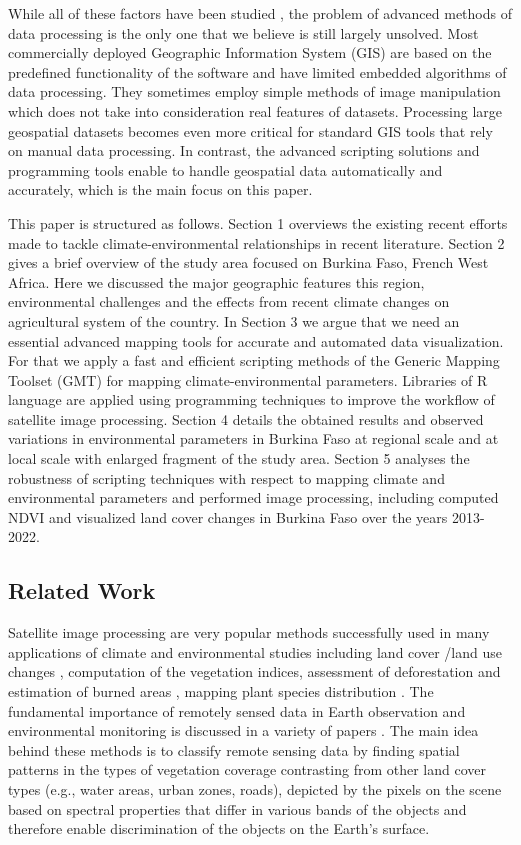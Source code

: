 \documentclass[knowledge,article,submit,pdftex,moreauthors]{Definitions/mdpi}
\begin{document}
While all of these factors have been studied \cite{Mather1987,Bocksberger}, the problem of advanced methods of data processing is the only one that we believe is still largely unsolved. Most commercially deployed Geographic Information System (GIS) are based on the predefined functionality of the software and have limited embedded algorithms of data processing. They sometimes employ simple methods of image manipulation which does not take into consideration real features of datasets. Processing large geospatial datasets becomes even more critical for standard GIS tools that rely on manual data processing. In contrast, the advanced scripting solutions and  programming tools enable to handle geospatial data automatically and accurately, which is the main focus on this paper.

This paper is structured as follows. Section 1 overviews the existing recent efforts made to tackle climate-environmental relationships in recent literature. Section 2 gives a brief overview of the study area focused on Burkina Faso, French West Africa. Here we discussed the major geographic features this region, environmental challenges and the effects from recent climate changes on agricultural system of the country. In Section 3 we argue that we need an essential advanced mapping tools for accurate and automated data visualization. For that we apply a fast and efficient scripting methods of the Generic Mapping Toolset (GMT) for mapping climate-environmental parameters. Libraries of R language are applied using programming techniques to improve the workflow of satellite image processing. Section 4 details the obtained results and observed variations in environmental parameters in Burkina Faso at regional scale and at local scale with enlarged fragment of the study area. Section 5 analyses the robustness of scripting techniques with respect to mapping climate and environmental parameters and performed image processing, including computed NDVI and visualized land cover changes in Burkina Faso over the years 2013-2022.

\subsection{Related Work}
Satellite image processing are very popular methods successfully used in many applications of climate and environmental studies including land cover /land use changes \cite{4780024,Ouedraogo,rs70912076}, computation of the vegetation indices, assessment of deforestation and estimation of burned areas \cite{MUSYIMI201795}, mapping plant species distribution \cite{DEVINEAU20101092}. The fundamental importance of remotely sensed data in Earth observation and environmental monitoring is discussed in a variety of papers \cite{Wilmet}. The main idea behind these methods is to classify remote sensing data by finding spatial patterns in the types of vegetation coverage contrasting from other land cover types (e.g., water areas, urban zones, roads), depicted by the pixels on the scene based on spectral properties that differ in various bands of the objects \cite{Richards} and therefore enable discrimination of the objects on the Earth's surface. 
\end{document}
